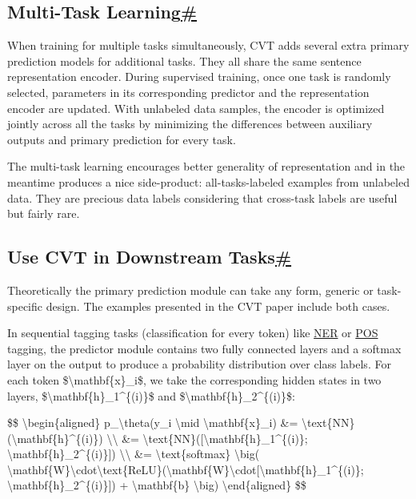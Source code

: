 \subsection{\texorpdfstring{Multi-Task Learning\hyperref[multi-task-learning]{\#}}{Multi-Task Learning\#}}\label{multi-task-learning}

When training for multiple tasks simultaneously, CVT adds several extra primary prediction models for additional tasks. They all share the same sentence representation encoder. During supervised training, once one task is randomly selected, parameters in its corresponding predictor and the representation encoder are updated. With unlabeled data samples, the encoder is optimized jointly across all the tasks by minimizing the differences between auxiliary outputs and primary prediction for every task.

The multi-task learning encourages better generality of representation and in the meantime produces a nice side-product: all-tasks-labeled examples from unlabeled data. They are precious data labels considering that cross-task labels are useful but fairly rare.

\subsection{\texorpdfstring{Use CVT in Downstream Tasks\hyperref[use-cvt-in-downstream-tasks]{\#}}{Use CVT in Downstream Tasks\#}}\label{use-cvt-in-downstream-tasks}

Theoretically the primary prediction module can take any form, generic or task-specific design. The examples presented in the CVT paper include both cases.

In sequential tagging tasks (classification for every token) like \hyperref[ner]{NER} or \hyperref[pos]{POS} tagging, the predictor module contains two fully connected layers and a softmax layer on the output to produce a probability distribution over class labels. For each token \$\textbackslash mathbf\{x\}\_i\$, we take the corresponding hidden states in two layers, \$\textbackslash mathbf\{h\}\_1\^{}\{(i)\}\$ and \$\textbackslash mathbf\{h\}\_2\^{}\{(i)\}\$:

\$\$ \textbackslash begin\{aligned\} p\_\textbackslash theta(y\_i \textbackslash mid \textbackslash mathbf\{x\}\_i) \&= \textbackslash text\{NN\}(\textbackslash mathbf\{h\}\^{}\{(i)\}) \textbackslash\textbackslash{} \&= \textbackslash text\{NN\}({[}\textbackslash mathbf\{h\}\_1\^{}\{(i)\}; \textbackslash mathbf\{h\}\_2\^{}\{(i)\}{]}) \textbackslash\textbackslash{} \&= \textbackslash text\{softmax\} \textbackslash big( \textbackslash mathbf\{W\}\textbackslash cdot\textbackslash text\{ReLU\}(\textbackslash mathbf\{W\textquotesingle\}\textbackslash cdot{[}\textbackslash mathbf\{h\}\_1\^{}\{(i)\}; \textbackslash mathbf\{h\}\_2\^{}\{(i)\}{]}) + \textbackslash mathbf\{b\} \textbackslash big) \textbackslash end\{aligned\} \$\$

